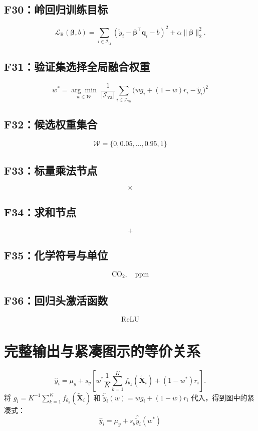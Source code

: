 \documentclass[UTF8,a4paper,11pt]{ctexart}
\begin{document}
\subsection*{F30：岭回归训练目标}
\[
\mathcal{L}_{\mathrm{R}}(\boldsymbol{\beta},b) =\sum_{i\in\mathcal{I}_{\mathrm{tr}}} (\widetilde{y}_i-\boldsymbol{\beta}^{\top}\mathbf{q}_i-b)^2 +\alpha\lVert\boldsymbol{\beta}\rVert_2^2.
\]

\subsection*{F31：验证集选择全局融合权重}
\[
w^*=\underset{w\in\mathcal{W}}{\arg\min}\; \frac{1}{|\mathcal{I}_{\mathrm{va}}|} \sum_{i\in\mathcal{I}_{\mathrm{va}}} \bigl(w g_i+(1-w)r_i-\widetilde{y}_i\bigr)^2
\]

\subsection*{F32：候选权重集合}
\[
\mathcal{W}=\{0,0.05,\ldots,0.95,1\}
\]

\subsection*{F33：标量乘法节点}
\[
\times
\]

\subsection*{F34：求和节点}
\[
+
\]

\subsection*{F35：化学符号与单位}
\[
\mathrm{CO}_{2},\quad\mathrm{ppm}
\]

\subsection*{F36：回归头激活函数}
\[
\operatorname{ReLU}
\]

\section{完整输出与紧凑图示的等价关系}
\[
\widehat{y}_i=\mu_y+s_y \left[w^*\frac{1}{K}\sum_{k=1}^{K} f_{\theta_k}(\widetilde{\mathbf{X}}_i) +(1-w^*)r_i\right].
\]
将 $g_i=K^{-1}\sum_{k=1}^{K}f_{\theta_k}(\widetilde{\mathbf X}_i)$ 和 $\widehat{\widetilde y}_i(w)=wg_i+(1-w)r_i$ 代入，得到图中的紧凑式：
\[
\widehat{y}_i=\mu_y+s_y\widehat{\widetilde{y}}_i(w^*)
\]
\end{document}
